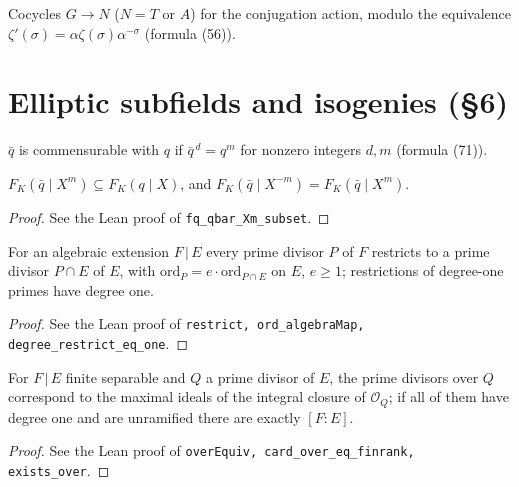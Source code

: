 \begin{definition}[Cohomology $H^1(G,T)$]
\label{def:H1-GT}
\leanok
Cocycles $G\to N$ ($N=T$ or $A$) for the conjugation action, modulo the equivalence $\zeta'(\sigma)=\alpha\zeta(\sigma)\alpha^{-\sigma}$ (formula (56)).
\end{definition}

\section{Elliptic subfields and isogenies (\S 6)}

\begin{definition}
\label{def:commensurable}
\leanok
$\bar q$ is commensurable with $q$ if $\bar q^{\,d}=q^m$ for nonzero integers $d,m$ (formula (71)).
\end{definition}

\begin{lemma}
\label{lem:XVII}
\leanok
$F_K(\bar q\mid X^m)\subseteq F_K(q\mid X)$, and $F_K(\bar q\mid X^{-m})=F_K(\bar q\mid X^m)$.
\end{lemma}
\begin{proof}
\leanok
See the Lean proof of \texttt{fq\_qbar\_Xm\_subset}.
\end{proof}

\begin{lemma}
\label{lem:ff-restrict}
\leanok
For an algebraic extension $F\,|\,E$ every prime divisor $P$ of $F$ restricts to a prime divisor $P\cap E$ of $E$, with $\mathrm{ord}_P=e\cdot\mathrm{ord}_{P\cap E}$ on $E$, $e\ge1$; restrictions of degree-one primes have degree one.
\end{lemma}
\begin{proof}
\leanok
See the Lean proof of \texttt{restrict, ord\_algebraMap, degree\_restrict\_eq\_one}.
\end{proof}

\begin{lemma}
\label{lem:ff-fundamental}
\leanok
For $F\,|\,E$ finite separable and $Q$ a prime divisor of $E$, the prime divisors over $Q$ correspond to the maximal ideals of the integral closure of $\mathcal O_Q$; if all of them have degree one and are unramified there are exactly $[F:E]$.
\end{lemma}
\begin{proof}
\leanok
See the Lean proof of \texttt{overEquiv, card\_over\_eq\_finrank, exists\_over}.
\end{proof}


